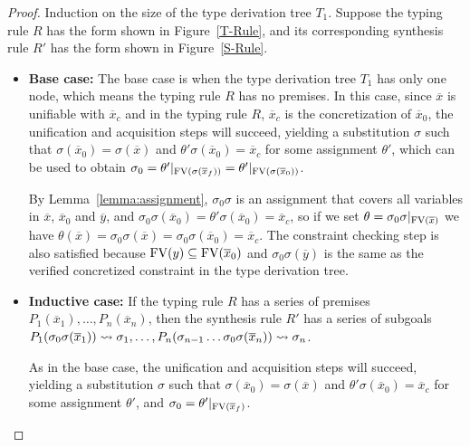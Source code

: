 \begin{proof}
  Induction on the size of the type derivation tree $T_1$. Suppose the typing rule $R$ has the form shown in Figure~\ref{T-Rule}, and its corresponding synthesis rule $R'$ has the form shown in Figure~\ref{S-Rule}.
  \begin{itemize}
    \item \textbf{Base case:} 
    The base case is when the type derivation tree $T_1$ has only one node, which means the typing rule $R$ has no premises. 
    In this case, since $\overline{x}$ is unifiable with $\overline{x}_c$ and in the typing rule $R$, $\overline{x}_c$ is the concretization of $\overline{x}_0$, the unification and acquisition steps will succeed, yielding a substitution $\sigma$ such that $\sigma(\overline{x}_0) = \sigma(\overline{x})$ and $\theta'\sigma(\overline{x}_0) = \overline{x}_c$ for some assignment $\theta'$, which can be used to obtain $\sigma_0 = \theta'|_{\text{FV}(\sigma(\overline{x}_f))}= \theta'|_{\text{FV}(\sigma(\overline{x}_0))}$.
    
    By Lemma~\ref{lemma:assignment}, $\sigma_0\sigma$ is an assignment that covers all variables in $\overline{x}$, $\overline{x}_0$ and $\overline{y}$, and $\sigma_0\sigma(\overline{x}_0) = \theta'\sigma(\overline{x}_0) = \overline{x}_c$, so if we set $\theta = \sigma_0\sigma|_{\text{FV}(\overline{x})}$ we have $\theta(\overline{x}) = \sigma_0\sigma(\overline{x})= \sigma_0\sigma(\overline{x}_0) = \overline{x}_c$. The constraint checking step is also satisfied because $\text{FV}(y)\subseteq \text{FV}(\overline{x}_0)$ and $\sigma_0\sigma(\overline{y})$ is the same as the verified concretized constraint in the type derivation tree.
    
    \item \textbf{Inductive case:} If the typing rule $R$ has a series of premises $P_1(\overline{x}_1), \ldots, P_n(\overline{x}_n)$, then the synthesis rule $R'$ has a series of subgoals $P_1( \sigma_0\sigma(\overline{x}_1) ) \leadsto \sigma_1, \ldots, P_n( \sigma_{n-1}\ldots\sigma_0\sigma(\overline{x}_n) ) \leadsto \sigma_n$.
    
    As in the base case, the unification and acquisition steps will succeed, yielding a substitution $\sigma$ such that $\sigma(\overline{x}_0) = \sigma(\overline{x})$ and $\theta'\sigma(\overline{x}_0) = \overline{x}_c$ for some assignment $\theta'$, and $\sigma_0 = \theta'|_{\text{FV}(\overline{x}_f)}$.
    

\end{itemize}
\end{proof}
